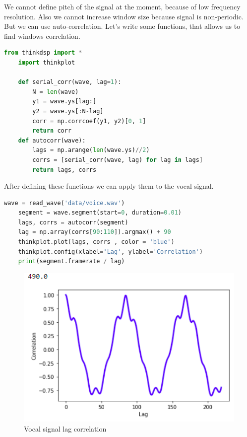 \documentclass[a4paper]{article}
\begin{document}
        We cannot define pitch of the signal at the moment, because of low frequency resolution. Also we cannot increase window size because signal is non-periodic. But we can use auto-correlation. Let's write some functions, that allows us to find windows correlation.
        
        \begin{lstlisting}[language=Python,caption=sserial-corr and autocorr functions,label={lst:part1_1}]
    from thinkdsp import *
    import thinkplot
    
    def serial_corr(wave, lag=1):
        N = len(wave)
        y1 = wave.ys[lag:]
        y2 = wave.ys[:N-lag]
        corr = np.corrcoef(y1, y2)[0, 1]
        return corr
    def autocorr(wave):
        lags = np.arange(len(wave.ys)//2)
        corrs = [serial_corr(wave, lag) for lag in lags]
        return lags, corrs
        \end{lstlisting}
        
        After defining these functions we can apply them to the vocal signal.
        
        \begin{lstlisting}[language=Python,caption=Vocal signal lag correlation estimation,label={lst:part1_1}]
    wave = read_wave('data/voice.wav')
    segment = wave.segment(start=0, duration=0.01)
    lags, corrs = autocorr(segment)
    lag = np.array(corrs[90:110]).argmax() + 90
    thinkplot.plot(lags, corrs , color = 'blue')
    thinkplot.config(xlabel='Lag', ylabel='Correlation')
    print(segment.framerate / lag)
        \end{lstlisting}
        
        \begin{figure}[H]
            \centering
            \includegraphics[width=\textwidth]{img/corr_lag.png}
            \caption{Vocal signal lag correlation}
            \label{fig:part1_1_1}
        \end{figure}
        
\end{document}

